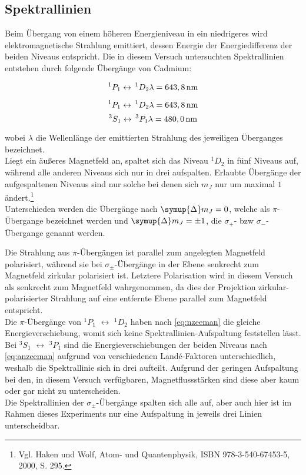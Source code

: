 \clearpage

\subsection{Spektrallinien}
\label{sec:spektral}

Beim Übergang von einem höheren Energieniveau in ein niedrigeres wird elektromagnetische Strahlung emittiert, dessen Energie der Energiedifferenz der beiden Niveaus entspricht.
Die in diesem Versuch untersuchten Spektrallinien entstehen durch folgende Übergänge von Cadmium:


\begin{equation*}
^1P_1 \leftrightarrow \,^1D_2   \text{$\lambda = 643,8$\,nm}
\end{equation*}

\begin{equation*}
^1P_1 \leftrightarrow \,^1D_2   \text{$\lambda = 643,8$\,nm}\\
\end{equation*}
\begin{equation*}
^3S_1 \leftrightarrow \,^3P_1   \text{$\lambda = 480,0$\,nm}
\end{equation*}


wobei $\lambda$ die Wellenlänge der emittierten Strahlung des jeweiligen Überganges bezeichnet.\\
Liegt ein äußeres Magnetfeld an, spaltet sich das Niveau $^1D_2$ in fünf Niveaus auf, während alle anderen Niveaus sich nur in drei aufspalten.
Erlaubte Übergänge der aufgespaltenen Niveaus sind nur solche bei denen sich $m_J$ nur um maximal $1$ ändert.\footnote{Vgl. Haken und Wolf, Atom- und Quantenphysik, ISBN 978-3-540-67453-5, 2000, S. 295.}\\
Unterschieden werden die Übergänge nach $\symup{\Delta} m_J = 0$, welche als $\pi$- Übergange bezeichnet werden und $\symup{\Delta} m_J = \pm 1$, die $\sigma_+$- bzw $\sigma_-$- Übergange genannt werden.




Die Strahlung aus $\pi$-Übergängen ist parallel zum angelegten Magnetfeld polarisiert, während sie bei $\sigma_\pm$-Übergänge in der Ebene senkrecht zum Magnetfeld zirkular polarisiert ist.
Letztere Polarisation wird in diesem Versuch als senkrecht zum Magnetfeld wahrgenommen, da dies der Projektion zirkular-polarisierter Strahlung auf eine entfernte Ebene parallel zum Magnetfeld entspricht.\\
Die $\pi$-Übergänge von $^1P_1$ $\leftrightarrow$ $^1D_2$ haben nach \autoref{eq:nzeeman} die gleiche Energieverschiebung, womit sich keine Spektrallinien-Aufspaltung feststellen lässt.
Bei $^3S_1$ $\leftrightarrow$ $^3P_1$ sind die Energieverschiebungen der beiden Niveaus nach \autoref{eq:anzeeman} aufgrund von verschiedenen Landé-Faktoren unterschiedlich, weshalb die Spektrallinie sich in drei aufteilt. Aufgrund der geringen Aufspaltung bei den, in diesem Versuch verfügbaren, Magnetflussstärken sind diese aber kaum oder gar nicht zu unterscheiden.\\
Die Spektrallinien der $\sigma_\pm$-Übergänge spalten sich alle auf, aber auch hier ist im Rahmen dieses Experiments nur eine Aufspaltung in jeweils drei Linien unterscheidbar.



